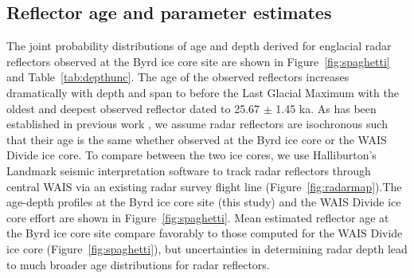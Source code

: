 
\subsection{Reflector age and parameter estimates}
The joint probability distributions of age and depth derived for englacial radar reflectors observed at the Byrd ice core site are shown in Figure~\ref{fig:spaghetti} and Table~\ref{tab:depthunc}. The age of the observed reflectors increases dramatically with depth and span to before the Last Glacial Maximum with the oldest and deepest observed reflector dated to 25.67 $\pm$ 1.45 ka. As has been established in previous work \citep{siegert1998,dowdeswellevans2004}, we assume radar reflectors are isochronous such that their age is the same whether observed at the Byrd ice core or the WAIS Divide ice core. To compare between the two ice cores, we use Halliburton's Landmark seismic interpretation software to track radar reflectors through central WAIS via an existing radar survey flight line (Figure~\ref{fig:radarmap}).The age-depth profiles at the Byrd ice core site (this study) and the WAIS Divide ice core effort are shown in Figure~\ref{fig:spaghetti}. Mean estimated reflector age at the Byrd ice core site compare favorably to those computed for the WAIS Divide ice core (Figure~\ref{fig:spaghetti}), but uncertainties in determining radar depth lead to much broader age distributions for radar reflectors.  

